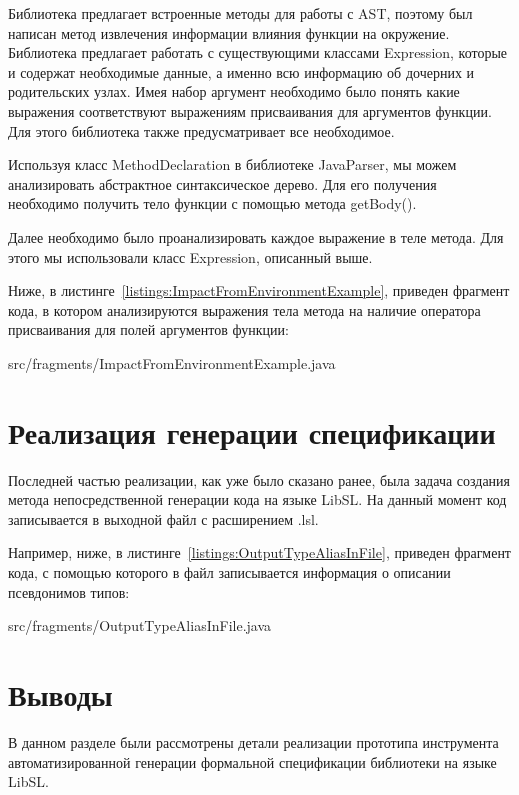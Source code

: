 Библиотека предлагает встроенные методы для работы с AST, поэтому был написан метод извлечения информации влияния функции на окружение.
Библиотека предлагает работать с существующими классами Expression, которые и содержат необходимые данные, а именно всю информацию об дочерних и родительских узлах.
Имея набор аргумент необходимо было понять какие выражения соответствуют выражениям присваивания для аргументов функции.
Для этого библиотека также предусматривает все необходимое.

Используя класс MethodDeclaration в библиотеке JavaParser, мы можем анализировать абстрактное синтаксическое дерево.
Для его получения необходимо получить тело функции с помощью метода getBody().

Далее необходимо было проанализировать каждое выражение в теле метода.
Для этого мы использовали класс Expression, описанный выше.

Ниже, в листинге~\ref{listings:ImpactFromEnvironmentExample}, приведен фрагмент кода, в котором анализируются выражения тела метода на наличие оператора присваивания для полей аргументов функции:

{src/fragments/ImpactFromEnvironmentExample.java}

\section{Реализация генерации спецификации}

Последней частью реализации, как уже было сказано ранее, была задача создания метода непосредственной генерации кода на языке LibSL.
На данный момент код записывается в выходной файл с расширением .lsl.

Например, ниже, в листинге~\ref{listings:OutputTypeAliasInFile}, приведен фрагмент кода, с помощью которого в файл записывается информация о описании псевдонимов типов:

{src/fragments/OutputTypeAliasInFile.java}

\section{Выводы}

В данном разделе были рассмотрены детали реализации прототипа инструмента автоматизированной генерации формальной спецификации библиотеки на языке LibSL.